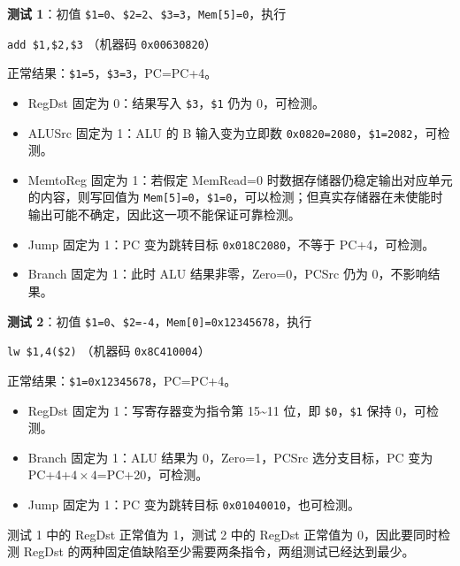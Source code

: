 \begin{problem}
\begin{solution}
\begin{enumerate}
            \textbf{测试 1}：初值 \texttt{\$1=0}、\texttt{\$2=2}、\texttt{\$3=3}，\texttt{Mem[5]=0}，执行
            \begin{center}
                \texttt{add \$1,\$2,\$3} \quad（机器码 \texttt{0x00630820}）
            \end{center}
            正常结果：\texttt{\$1=5}，\texttt{\$3=3}，PC=PC+4。
            \begin{itemize}
                \item RegDst 固定为 0：结果写入 \texttt{\$3}，\texttt{\$1} 仍为 0，可检测。
                \item ALUSrc 固定为 1：ALU 的 B 输入变为立即数 \texttt{0x0820=2080}，\texttt{\$1=2082}，可检测。
                \item MemtoReg 固定为 1：若假定 MemRead=0 时数据存储器仍稳定输出对应单元的内容，则写回值为 \texttt{Mem[5]=0}，\texttt{\$1=0}，可以检测；但真实存储器在未使能时输出可能不确定，因此这一项不能保证可靠检测。
                \item Jump 固定为 1：PC 变为跳转目标 \texttt{0x018C2080}，不等于 PC+4，可检测。
                \item Branch 固定为 1：此时 ALU 结果非零，Zero=0，PCSrc 仍为 0，不影响结果。
            \end{itemize}

            \textbf{测试 2}：初值 \texttt{\$1=0}、\texttt{\$2=-4}，\texttt{Mem[0]=0x12345678}，执行
            \begin{center}
                \texttt{lw \$1,4(\$2)} \quad（机器码 \texttt{0x8C410004}）
            \end{center}
            正常结果：\texttt{\$1=0x12345678}，PC=PC+4。
            \begin{itemize}
                \item RegDst 固定为 1：写寄存器变为指令第 15\textasciitilde 11 位，即 \texttt{\$0}，\texttt{\$1} 保持 0，可检测。
                \item Branch 固定为 1：ALU 结果为 0，Zero=1，PCSrc 选分支目标，PC 变为 PC+4+$4\times4$=PC+20，可检测。
                \item Jump 固定为 1：PC 变为跳转目标 \texttt{0x01040010}，也可检测。
            \end{itemize}

            测试 1 中的 RegDst 正常值为 1，测试 2 中的 RegDst 正常值为 0，因此要同时检测 RegDst 的两种固定值缺陷至少需要两条指令，两组测试已经达到最少。
        \end{enumerate}
    \end{solution}
\end{problem}

